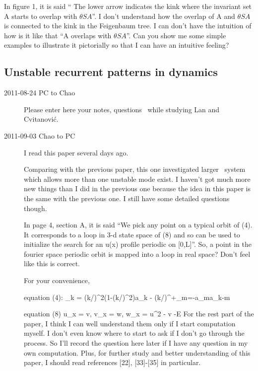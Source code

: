 \begin{description}
In figure 1, it is said `` The lower arrow indicates the kink where the
invariant set A starts to overlap with $\theta SA$''. I don't understand
how the overlap of A and $\theta SA$ is connected to the kink in the
Feigenbaum tree. I can don't have the intuition of how is it like that
``A overlaps with $\theta SA$''. Can you show me some simple examples to
illustrate it pictorially so that I can have an intuitive feeling?

\end{description}

\subsection{Unstable recurrent patterns in {\KS} dynamics}
\label{s:lanCvit07}

\begin{description}

\item[2011-08-24 PC to Chao]
Please enter here your notes, questions \etc\ while studying
Lan and Cvitanovi{\'c}.
\item[2011-09-03 Chao to PC]
I read this paper several days ago.

Comparing with the previous paper, this one investigated larger
\KS\ system which allows more than one unstable mode
exist. I haven't got much more new things than I did in the previous one
because the idea in this paper is the same with the previous one. I still
have some detailed questions though.

In page 4, section A, it is said ``We pick any point on a typical orbit
of (4). It corresponds to a loop in 3-d state space of (8) and so can be
used to initialize the search for an u(x) profile periodic on [0,L]''.
So, a point in the fourier space periodic orbit is mapped into a loop in
real space? Don't feel like this is correct.

For your convenience,

equation (4):
\beq
\displaystyle{}_{k}
= (k/)^{2}(1-(k/)^{2})a_{k}
- (k/)\sum\nolimits^{+\infty}_{m=-\infty}a_{m}a_{k-m}
\eeq

equation (8)
\beq u_x = v, v_x = w, w_x = u^2 - v -E
\eeq
For the rest part of the paper, I think I can well understand them only
if I start computation myself. I don't even know where to start to ask if
I don't go through the process. So I'll record the question here later if
I have any question in my own computation.
Plus, for further study and better understanding of this paper, I should
read references [22], [33]-[35] in particular.

\end{description}



